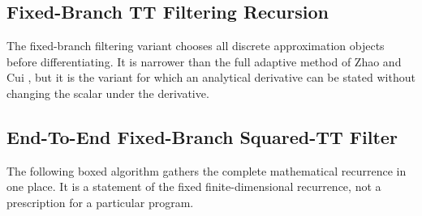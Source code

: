 \documentclass[11pt]{article}
\numberwithin{equation}{section}
\begin{document}
\subsection{Fixed-Branch TT Filtering Recursion}

The fixed-branch filtering variant chooses all discrete approximation objects
before differentiating.  It is narrower than the full adaptive method of
Zhao and Cui \cite{zhao2024ttsequential}, but it is the variant for which an
analytical derivative can be stated without changing the scalar under the
derivative.

\subsection{End-To-End Fixed-Branch Squared-TT Filter}

The following boxed algorithm gathers the complete mathematical recurrence in one
place.  It is a statement of the fixed finite-dimensional recurrence, not a
prescription for a particular program.
\end{document}
